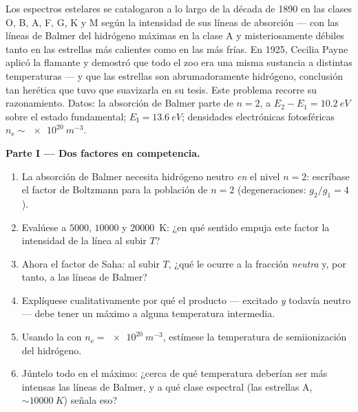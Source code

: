\begin{problem}\label{pb:b3:grand-canonical:1}
Los espectros estelares se catalogaron a lo largo de la década de 1890 en
las clases O, B, A, F, G, K y M según la intensidad de sus líneas de
absorción --- con las líneas de Balmer del hidrógeno máximas en la clase A y
misteriosamente débiles tanto en las estrellas más calientes como en las más
frías. En 1925, Cecilia Payne aplicó la flamante  y demostró
que todo el zoo era una misma sustancia a distintas temperaturas --- y que
las estrellas son abrumadoramente hidrógeno, conclusión tan herética que
tuvo que suavizarla en su tesis. Este problema recorre su razonamiento.
Datos: la absorción de Balmer parte de $n = 2$, a $E_2 - E_1 =
\qty{10.2}{eV}$ sobre el estado fundamental; $E_{\text{I}} =
\qty{13.6}{eV}$; densidades electrónicas fotosféricas $n_{\text{e}}
\sim \qty{e20}{m^{-3}}$.

\medskip\noindent\textbf{Parte I --- Dos factores en competencia.}
\begin{enumerate}
  \item La absorción de Balmer necesita hidrógeno neutro \emph{en} el nivel $n =
        2$: escríbase el factor de Boltzmann para la población de $n = 2$
        (degeneraciones: $g_2/g_1 = 4$).
  \item Evalúese a $5000$, $10000$ y \qty{20000}{K}: ¿en qué sentido
        empuja este factor la intensidad de la línea al subir $T$?
  \item Ahora el factor de Saha: al subir $T$, ¿qué le ocurre a la
        fracción \emph{neutra} y, por tanto, a las líneas de Balmer?
  \item Explíquese cualitativamente por qué el producto --- excitado
        \emph{y} todavía neutro --- debe tener un máximo a alguna
        temperatura intermedia.
  \item Usando la  con $n_{\text{e}} =
        \qty{e20}{m^{-3}}$, estímese la temperatura de
        semiionización del hidrógeno.
  \item Júntelo todo en el máximo: ¿cerca de qué temperatura deberían ser
        más intensas las líneas de Balmer, y a qué clase espectral
        (las estrellas A, $\sim\qty{10000}{K}$) señala eso?
\end{enumerate}


\end{problem}
